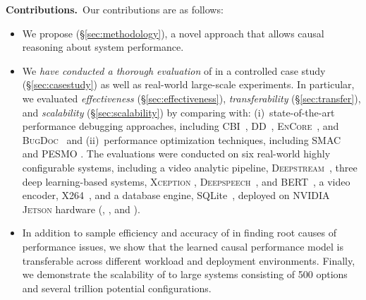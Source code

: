 \noindent\textbf{Contributions.}~Our contributions are as follows:
\begin{itemize}
    \item We propose \ourapproach (\S\ref{sec:methodology}), a novel approach that allows causal reasoning about system performance.
    \item We \emph{have conducted a thorough evaluation} of \ourapproach in a controlled case study (\S\ref{sec:casestudy}) as well as real-world large-scale experiments. In particular, we evaluated \emph{effectiveness} (\S\ref{sec:effectiveness}), \emph{transferability} (\S\ref{sec:transfer}), and \emph{scalability} (\S\ref{sec:scalability}) by comparing \ourapproach with: (i)~state-of-the-art performance debugging approaches, including \textsc{CBI}~\cite{song2014statistical}, \textsc{DD}~\cite{artho2011iterative}, \textsc{EnCore}~\cite{zhang2014encore}, and \textsc{BugDoc}~\cite{lourencco2020bugdoc} and (ii)~performance optimization techniques, including \textsc{SMAC}~\cite{hutter2011sequential} and \textsc{PESMO} \cite{hernandez2016predictive}. The evaluations were conducted on six real-world highly configurable systems, including a video analytic pipeline, \textsc{Deepstream}~\cite{DeepStream}, three deep learning-based systems, \textsc{Xception} \cite{chollet2017xception}, \textsc{Deepspeech}~\cite{hannun2014deep}, and \textsc{BERT}~\cite{devlin2018bert}, a video encoder, X264~\cite{x264}, and a database engine, SQLite~\cite{SQLite}, deployed on \textsc{NVIDIA Jetson} hardware (\txone, \txtwo, and \xavier). \item In addition to sample efficiency and accuracy of \ourapproach in finding root causes of performance issues, we show that the learned causal performance model is transferable across different workload and deployment environments. Finally, we demonstrate the scalability of \ourapproach to large systems consisting of 500 options and several trillion potential configurations.  

\end{itemize}
